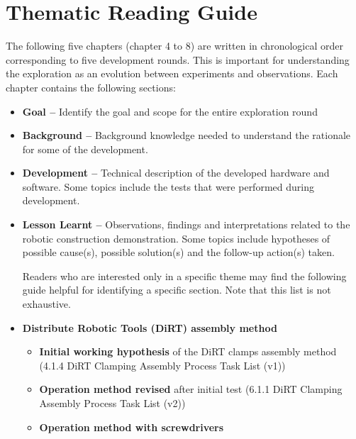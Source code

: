 \section{Thematic Reading Guide}
\label{section:methodology_thematic_reading_guide}

The following five chapters (chapter 4 to 8) are written in chronological order corresponding to five development rounds. This is important for understanding the exploration as an evolution between experiments and observations.  Each chapter contains the following sections:

\begin{itemize}
	\item \textbf{Goal --} Identify the goal and scope for the entire exploration round

	\item \textbf{Background --} Background knowledge needed to understand the rationale for some of the development.

	\item \textbf{Development --} Technical description of the developed hardware and software. Some topics include the tests that were performed during development.

	\item \textbf{Lesson Learnt --} Observations, findings and interpretations related to the robotic construction demonstration. Some topics include hypotheses of possible cause(s), possible solution(s) and the follow-up action(s) taken. 

Readers who are interested only in a specific theme may find the following guide helpful for identifying a specific section. Note that this list is not exhaustive. 

	\item \textbf{Distribute Robotic Tools (DiRT) assembly method}

\begin{itemize}
	\item \textbf{Initial working hypothesis} of the DiRT clamps assembly method (4.1.4 DiRT Clamping Assembly Process Task List (v1))

	\item \textbf{Operation method revised} after initial test (6.1.1 DiRT Clamping Assembly Process Task List (v2))

	\item \textbf{Operation method with screwdrivers} 


\end{itemize}
\end{itemize}
